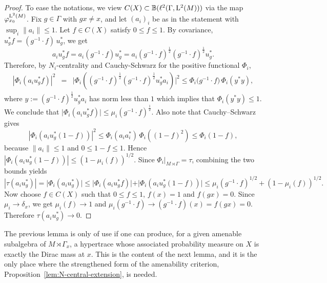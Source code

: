 \documentclass[12pt]{amsart} %
\theoremstyle{plain}
\theoremstyle{definition}
\begin{document}
\begin{proof} To ease the notations, we view $C(X)\subset\mathbb{B}(\ell^2(\Gamma,{\rm L}^2(M)))$ via the map $\varphi_{x_0}^{{\rm L}^2(M)}$. Fix $g\in \Gamma$ with $gx\neq x$, and let $(a_i)_i$ be as in the statement with
$\sup_i\|a_i\|\leq 1$. Let $f\in C(X)$ satisfy $0\leq f\leq 1$. By covariance, $u_g^*f=(g^{-1}\!\cdot f)\,u_g^*$, we get
$$
a_i u_g^*f = a_i (g^{-1}\!\cdot f)u_g^*=a_i (g^{-1}\!\cdot f)^{\frac{1}{2}}(g^{-1}\!\cdot f)^{\frac{1}{2}}u_g^*.
$$
Therefore, by $N_i$-centrality and Cauchy-Schwarz for the positive functional $\Phi_i$,
\begin{eqnarray*}
|\Phi_i(a_i u_g^*f)|^2
&=&\vert\Phi_i((g^{-1}\!\cdot f)^{\frac{1}{2}}(g^{-1}\!\cdot f)^{\frac{1}{2}}u_g^*a_i)\vert^2\leq
\Phi_i\big(g^{-1}\!\cdot f\big)\,
\Phi_i(y^*y)\iffalse)\fi,
\end{eqnarray*}
where $y:=(g^{-1}\!\cdot f)^{\frac{1}{2}}u_g^*a_i$ has norm less than $1$ which implies that $\Phi_i(y^*y)\leq 1$. We conclude that $\vert\Phi_i(a_iu_g^*f)\vert\leq \mu_i(g^{-1}\cdot f)^\frac{1}{2}$. Also note that Cauchy--Schwarz gives
$$
|\Phi_i(a_i u_g^*(1-f))|^2
\leq
\Phi_i(a_i a_i^*)\,\Phi_i((1-f)^2)
\leq
\Phi_i(1-f),
$$
because $\|a_i\|\leq 1$ and $0\leq 1-f\leq 1$. Hence $|\Phi_i(a_i u_g^*(1-f))|
\leq
(1-\mu_i(f))^{1/2}$.
\noindent Since $\Phi_i\vert_{M\rtimes\Gamma}=\tau$, combining the two bounds yields
$$
|\tau(a_i u_g^*)|=\vert\Phi_i(a_iu_g^*)\vert\leq \vert\Phi_i(a_iu_g^*f)\vert+\vert\Phi_i(a_iu_g^*(1-f))\vert
\leq
\mu_i(g^{-1}\!\cdot f)^{1/2} + (1-\mu_i(f))^{1/2}.
$$
\noindent Now choose $f\in C(X)$ such that $0\leq f\leq 1$, $f(x)=1$ and $f(gx)=0$.
Since $\mu_i\to \delta_x$, we get $\mu_i(f)\to 1$ and $\mu_i(g^{-1}\!\cdot f)\to (g^{-1}\!\cdot f)(x)=f(gx)=0$. Therefore $\tau(a_i u_g^*)\to 0$.\end{proof}

\noindent The previous lemma is only of use if one can produce, for a given
amenable subalgebra of $M\rtimes\Gamma_x$, a hypertrace whose associated
probability measure on $X$ is exactly the Dirac mass at $x$. This is the content
of the next lemma, and it is the only place where the strengthened form of the
amenability criterion, Proposition~\ref{lem:N-central-extension}, is needed.
\end{document}

